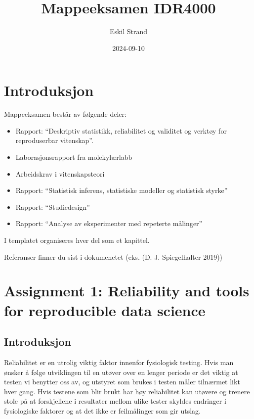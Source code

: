 \documentclass[
  letterpaper,
  DIV=11,
  numbers=noendperiod]{scrreprt}
\title{Mappeeksamen IDR4000}
\author{Eskil Strand}
\date{2024-09-10}
\providecommand{\tightlist}{%
  \setlength{\itemsep}{0pt}\setlength{\parskip}{0pt}}\usepackage{longtable,booktabs,array}
\renewcommand*\contentsname{Table of contents}
\newcommand\contentsname{Table of contents}
\begin{document}
\maketitle

\renewcommand*\contentsname{Table of contents}
{
\hypersetup{linkcolor=}
\setcounter{tocdepth}{2}
\tableofcontents
}


\chapter*{Introduksjon}\label{introduksjon}


Mappeeksamen består av følgende deler:

\begin{itemize}
\tightlist
\item
  Rapport: ``Deskriptiv statistikk, reliabilitet og validitet og verktøy
  for reproduserbar vitenskap''.
\item
  Laborasjonsrapport fra molekylærlabb
\item
  Arbeidskrav i vitenskapsteori
\item
  Rapport: ``Statistisk inferens, statistiske modeller og statistisk
  styrke''
\item
  Rapport: ``Studiedesign''
\item
  Rapport: ``Analyse av eksperimenter med repeterte målinger''
\end{itemize}

I templatet organiseres hver del som et kapittel.

Referanser finner du sist i dokumenetet (eks. (D. J. Spiegelhalter
2019))


\chapter{Assignment 1: Reliability and tools for reproducible data
science}\label{assignment1}

\section{Introduksjon}\label{introduksjon-1}

Reliabilitet er en utrolig viktig faktor innenfor fysiologisk testing.
Hvis man ønsker å følge utviklingen til en utøver over en lenger periode
er det viktig at testen vi benytter oss av, og utstyret som brukes i
testen måler tilnærmet likt hver gang. Hvis testene som blir brukt har
høy reliabilitet kan utøvere og trenere stole på at forskjellene i
resultater mellom ulike tester skyldes endringer i fysiologiske faktorer
og at det ikke er feilmålinger som gir utslag.
\end{document}
